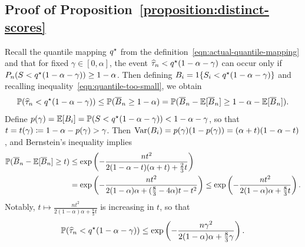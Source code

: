 \documentclass[11pt]{article}
\newcommand{\scorerv}{S}
\begin{document}
\subsection{Proof of Proposition~\ref{proposition:distinct-scores}}
\label{sec:proof-distinct-scores}


Recall the quantile mapping $q^\star$ from
the definition~\eqref{eqn:actual-quantile-mapping} and that
for fixed $\gamma \in [0, \alpha]$, the event
$\widehat{\tau}_n < q^\star(1 - \alpha - \gamma)$
can occur only if
$P_n(\scorerv < q\opt(1 - \alpha - \gamma)) \ge 1 - \alpha$.
%
Then defining $B_i = \indic{\scorerv_i < q\opt(1 - \alpha - \gamma)}$
and recalling inequality~\eqref{eqn:quantile-too-small},
we obtain
\begin{align*}
  \mathbb{P}(\widehat{\tau}_n < q^\star(1 - \alpha - \gamma))
  \le \mathbb{P}(\overline{B}_n \ge 1 - \alpha)
  = \mathbb{P}(\overline{B}_n - \mathbb{E}[\overline{B}_n] \ge 1 - \alpha - \mathbb{E}[\overline{B}_n]).
\end{align*}
Define $p(\gamma) = \E[B_i]
= \P(\scorerv < q\opt(1 - \alpha - \gamma)) < 1 - \alpha - \gamma$,
so that $t = t(\gamma) \coloneqq 1 - \alpha - p(\gamma) > \gamma$.
%
Then ${\rm Var}(B_i) = p(\gamma)(1 - p(\gamma))
= (\alpha + t)(1 - \alpha - t)$, and Bernstein's inequality
implies
\begin{align*}
  \mathbb{P}(\overline{B}_n - \mathbb{E}[\overline{B}_n] \ge t)
  & \le \exp\left(-\frac{n t^2}{2 (1 - \alpha - t) (\alpha + t)
    + \frac{2}{3} t}\right) \\
  & = \exp\left(-\frac{n t^2}{2 (1 - \alpha) \alpha +
    (\frac{8}{3} - 4 \alpha) t - t^2}\right)
  \le \exp\left(-\frac{n t^2}{2(1 - \alpha) \alpha
    + \frac{8}{3} t}\right).
\end{align*}
Notably, $t \mapsto \frac{nt^2}{2(1 - \alpha) \alpha + \frac{8}{3} t}$
is increasing in $t$, so that
\begin{equation*}
  \mathbb{P}(\widehat{\tau}_n < q^\star(1 - \alpha - \gamma))
  \le \exp\left(-\frac{n \gamma^2}{2(1 - \alpha) \alpha + \frac{8}{3} \gamma}
  \right).
\end{equation*}
\end{document}
